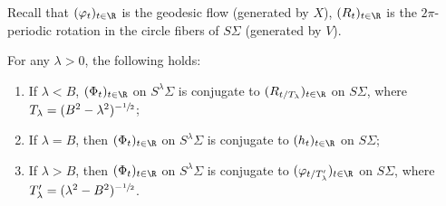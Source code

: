 Recall that $(\varphi_t)_{t \in \R}$ is the geodesic flow (generated by $X$), $(R_t)_{t \in \R}$ is the $2\pi$-periodic rotation in the circle fibers of $S\Sigma$ (generated by $V$).

\begin{proposition}
\label{proposition:dynamic}
For any $\lambda> 0$, the following holds:
\begin{enumerate}

\item\label{proposition:dynamici} If $ \lambda< B$, $(\Phi_t)_{t \in \R}$ on $S^\lambda\Sigma$ is conjugate to $(R_{t/T_\lambda})_{t \in \R}$ on $S\Sigma$, where $T_\lambda = (B^2 - \lambda^2)^{-\sfrac{1}{2}}$;

\item\label{proposition:dynamicii} If $ \lambda = B$, then $(\Phi_t)_{t \in \R}$ on $S^\lambda\Sigma$ is conjugate to $(h_t)_{t \in \R}$ on $S\Sigma$;

\item\label{proposition:dynamiciii} If $ \lambda>B$, then $(\Phi_t)_{t \in \R}$ on $S^\lambda\Sigma$ is conjugate to $(\varphi_{t/T'_\lambda})_{t \in \R}$ on $S\Sigma$, where $ T_\lambda' = (\lambda^2 -B^2)^{-\sfrac{1}{2}}$.
\end{enumerate}
\end{proposition}


